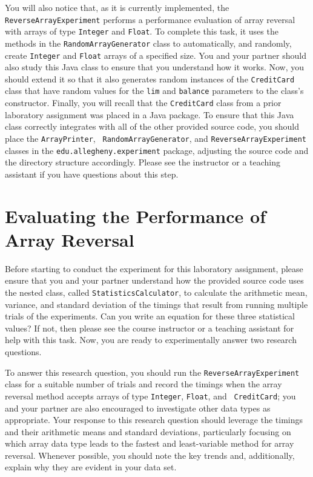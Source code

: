 You will also notice that, as it is currently implemented, the {\tt ReverseArrayExperiment} performs a performance
evaluation of array reversal with arrays of type {\tt Integer} and {\tt Float}. To complete this task, it uses the
methods in the {\tt RandomArrayGenerator} class to automatically, and randomly, create {\tt Integer} and {\tt Float}
arrays of a specified size. You and your partner should also study this Java class to ensure that you understand how it
works. Now, you should extend it so that it also generates random instances of the {\tt CreditCard} class that have
random values for the {\tt lim} and {\tt balance} parameters to the class's constructor. Finally, you will recall that
the {\tt CreditCard} class from a prior laboratory assignment was placed in a Java package. To ensure that this Java
class correctly integrates with all of the other provided source code, you should place the {\tt ArrayPrinter}, {\tt
RandomArrayGenerator}, and {\tt ReverseArrayExperiment} classes in the {\tt edu.allegheny.experiment} package, adjusting
the source code and the directory structure accordingly. Please see the instructor or a teaching assistant if you have
questions about this step.

\section*{Evaluating the Performance of Array Reversal}

Before starting to conduct the experiment for this laboratory assignment, please ensure that you and your partner
understand how the provided source code uses the nested class, called {\tt StatisticsCalculator}, to calculate the
arithmetic mean, variance, and standard deviation of the timings that result from running multiple trials of the
experiments. Can you write an equation for these three statistical values? If not, then please see the course instructor
or a teaching assistant for help with this task. Now, you are ready to experimentally answer two research questions.

 To
answer this research question, you should run the {\tt ReverseArrayExperiment} class for a suitable number of trials and
record the timings when the array reversal method accepts arrays of type {\tt Integer}, {\tt Float}, and {\tt
CreditCard}; you and your partner are also encouraged to investigate other data types as appropriate. Your response to
this research question should leverage the timings and their arithmetic means and standard deviations, particularly
focusing on which array data type leads to the fastest and least-variable method for array reversal. Whenever possible,
you should note the key trends and, additionally, explain why they are evident in your data set.


